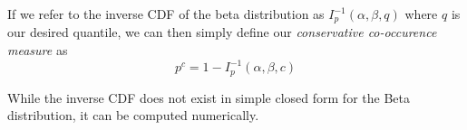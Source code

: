 \documentclass[conference]{IEEEtran}
\begin{document}
If we refer to the inverse CDF of the beta distribution as $I^{-1}_p(\alpha,\beta,q)$ where $q$ is our desired quantile, we can then simply define our \emph{conservative co-occurence measure} as
\begin{equation}
p^c= 1 - I^{-1}_p(\alpha,\beta,c)
\end{equation}

While the inverse CDF does not exist in simple closed form for the Beta distribution, it can be computed numerically.



\end{document}
